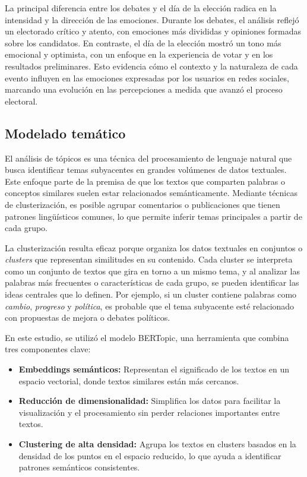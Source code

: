 \documentclass[10pt, a4paper]{article}
\begin{document}
	La principal diferencia entre los debates y el día de la elección radica en la intensidad y la dirección de las emociones. Durante los debates, el análisis reflejó un electorado crítico y atento, con emociones más divididas y opiniones formadas sobre los candidatos. En contraste, el día de la elección mostró un tono más emocional y optimista, con un enfoque en la experiencia de votar y en los resultados preliminares. Esto evidencia cómo el contexto y la naturaleza de cada evento influyen en las emociones expresadas por los usuarios en redes sociales, marcando una evolución en las percepciones a medida que avanzó el proceso electoral.
	
	
	
	\subsection{Modelado temático}
	
	El análisis de tópicos es una técnica del procesamiento de lenguaje natural que busca identificar temas subyacentes en grandes volúmenes de datos textuales. Este enfoque parte de la premisa de que los textos que comparten palabras o conceptos similares suelen estar relacionados semánticamente. Mediante técnicas de clusterización, es posible agrupar comentarios o publicaciones que tienen patrones lingüísticos comunes, lo que permite inferir temas principales a partir de cada grupo.
	
	La clusterización resulta eficaz porque organiza los datos textuales en conjuntos o \textit{clusters} que representan similitudes en su contenido. Cada cluster se interpreta como un conjunto de textos que gira en torno a un mismo tema, y al analizar las palabras más frecuentes o características de cada grupo, se pueden identificar las ideas centrales que lo definen. Por ejemplo, si un cluster contiene palabras como \textit{cambio}, \textit{progreso} y \textit{política}, es probable que el tema subyacente esté relacionado con propuestas de mejora o debates políticos.
	
	En este estudio, se utilizó el modelo BERTopic, una herramienta que combina tres componentes clave:
	\begin{itemize}
		\item \textbf{Embeddings semánticos:} Representan el significado de los textos en un espacio vectorial, donde textos similares están más cercanos.
		\item \textbf{Reducción de dimensionalidad:} Simplifica los datos para facilitar la visualización y el procesamiento sin perder relaciones importantes entre textos.
		\item \textbf{Clustering de alta densidad:} Agrupa los textos en clusters basados en la densidad de los puntos en el espacio reducido, lo que ayuda a identificar patrones semánticos consistentes.
	\end{itemize}
	
\end{document}
